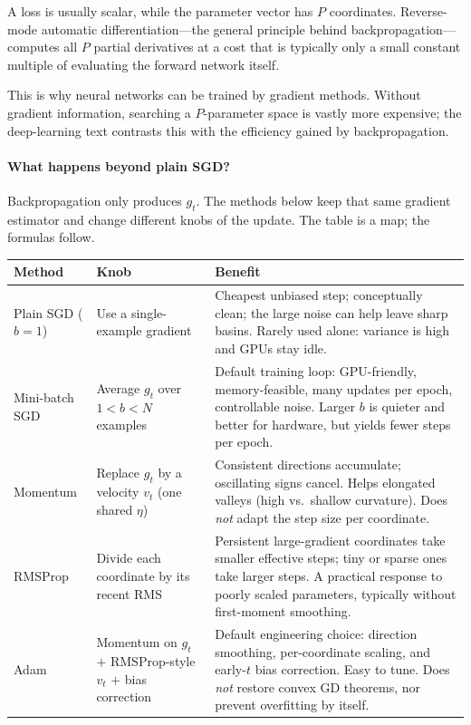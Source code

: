 \documentclass[11pt,a4paper]{article}
\theoremstyle{definition}
\begin{document}
\begin{note}
A loss is usually scalar, while the parameter vector has $P$ coordinates. Reverse-mode automatic differentiation—the general principle behind backpropagation—computes all $P$ partial derivatives at a cost that is typically only a small constant multiple of evaluating the forward network itself.

This is why neural networks can be trained by gradient methods. Without gradient information, searching a $P$-parameter space is vastly more expensive; the deep-learning text contrasts this with the efficiency gained by backpropagation.
\end{note}



\paragraph{What happens beyond plain SGD?}

Backpropagation only produces $g_t$. The methods below keep that same gradient estimator and change different knobs of the update. The table is a map; the formulas follow.

{\footnotesize
\setlength{\tabcolsep}{3pt}
\renewcommand{\arraystretch}{1.2}
\noindent
\begin{tabularx}{\linewidth}{|
  >{\raggedright\arraybackslash}p{2.4cm}|
  >{\raggedright\arraybackslash}p{3.4cm}|
  >{\raggedright\arraybackslash}X|
}
\hline
\textbf{Method} & \textbf{Knob} & \textbf{Benefit} \\
\hline
Plain SGD ($b=1$) & Use a single-example gradient & Cheapest unbiased step; conceptually clean; the large noise can help leave sharp basins. Rarely used alone: variance is high and GPUs stay idle. \\
\hline
Mini-batch SGD & Average $g_t$ over $1<b<N$ examples & Default training loop: GPU-friendly, memory-feasible, many updates per epoch, controllable noise. Larger $b$ is quieter and better for hardware, but yields fewer steps per epoch. \\
\hline
Momentum & Replace $g_t$ by a velocity $v_t$ (one shared $\eta$) & Consistent directions accumulate; oscillating signs cancel. Helps elongated valleys (high vs.\ shallow curvature). Does \emph{not} adapt the step size per coordinate. \\
\hline
RMSProp & Divide each coordinate by its recent RMS & Persistent large-gradient coordinates take smaller effective steps; tiny or sparse ones take larger steps. A practical response to poorly scaled parameters, typically without first-moment smoothing. \\
\hline
Adam & Momentum on $g_t$ $+$ RMSProp-style $v_t$ $+$ bias correction & Default engineering choice: direction smoothing, per-coordinate scaling, and early-$t$ bias correction. Easy to tune. Does \emph{not} restore convex GD theorems, nor prevent overfitting by itself. \\
\hline
\end{tabularx}
}
\end{document}
